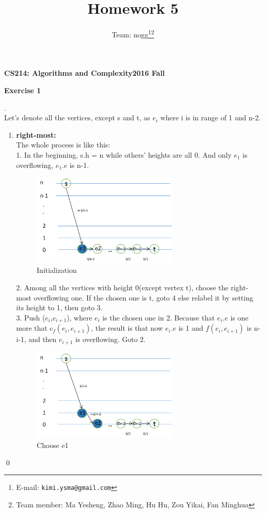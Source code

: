 \documentclass[12pt, notitlepage]{article}
\title{Homework 5}
\author{Team: nogg\footnote{E-mail: \texttt{kimi.ysma@gmail.com}}\footnote{Team member: Ma Yesheng, Zhao Ming, Hu Hu, Zou Yikai, Fan Minghua}}
\newenvironment{sol}
  {\par\vspace{3mm}\noindent{\it Solution}.}{\qed}
\begin{document}
{\bf\small CS214: Algorithms and Complexity}\hfill{\bf\small 2016 Fall}
{\let\newpage\relax\maketitle}

\textbf{Exercise 1}
\begin{sol}\\
Let's denote all the vertices, except s and t, as $e_i$ where i is in range of 1 and n-2.
\begin{enumerate}
\item\textbf{right-most:}\\
The whole process is like this:\\
1. In the beginning, s.h = n while others' heights are all 0. And only $e_1$ is overflowing, $e_1.e$ is n-1.
	\begin{figure}[H]\centering
	\includegraphics[width=7cm]{1.png}
	\caption{Initialization}
	\end{figure}
2. Among all the vertices with height 0(except vertex t), choose the right-most overflowing one. If the chosen one is t, goto 4 else relabel it by setting its height to 1, then goto 3.\\
3. Push ($e_i$,$e_{i+1}$), where $e_i$ is the chosen one in 2. Because that $e_i.e$ is one more that $c_f(e_i,e_{i+1})$, the result is that now $e_i.e$ is 1 and $f(e_i,e_{i+1})$ is n-i-1, and then $e_{i+1}$ is overflowing. Goto 2.\\
	\begin{figure}[H]\centering
	\includegraphics[width=7cm]{2.png}
	\caption{Choose e1}
	\end{figure}

\end{enumerate}
\end{sol}
\end{document}
